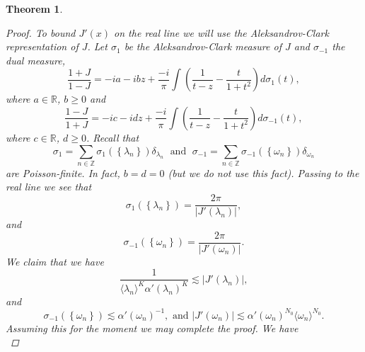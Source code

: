 \documentclass{article}[12pt]
\newtheorem{theorem}{Theorem}
\theoremstyle{remark}
\begin{document}
\begin{theorem}
\begin{proof}
            To bound $J'(x)$ on the real line we will use the Aleksandrov-Clark representation of $J$. Let $\sigma_{1}$ be the Aleksandrov-Clark measure of $J$ and $\sigma_{-1}$ the dual measure,
            \begin{equation*}
                \frac{1+J}{1-J} = -ia-ibz + \frac{-i}{ \pi}\int \left( \frac{1}{t-z}-\frac{t}{1+t^{2}}\right)d\sigma_{1}(t),
            \end{equation*}
            where $a \in \mathbb{R}$, $b \geq 0$ and
            \begin{equation*}
                \frac{1-J}{1+J} = -ic-idz + \frac{-i}{ \pi}\int \left( \frac{1}{t-z}-\frac{t}{1+t^{2}}\right)d\sigma_{-1}(t),
            \end{equation*}
            where $c \in \mathbb{R}$, $d \geq 0$. Recall that
            \begin{equation*}
                \sigma_{1} = \sum_{n \in \mathbb{Z}} \sigma_{1}(\left\{ \lambda_{n} \right\})\delta_{\lambda_{n}} \; \text{ and } \; \sigma_{-1} = \sum_{n \in \mathbb{Z}} \sigma_{-1}(\left\{ \omega_{n} \right\})\delta_{\omega_{n}}
            \end{equation*}
            are Poisson-finite. In fact, $b = d = 0$ (but we do not use this fact). Passing to the real line we see that
            \begin{equation*}
                \sigma_{1}(\left\{ \lambda_{n}\right\}) = \frac{2\pi}{\lvert J'(\lambda_{n}) \rvert},
            \end{equation*}
            and
            \begin{equation*}
                \sigma_{-1}(\left\{ \omega_{n}\right\}) = \frac{2\pi}{\lvert J'(\omega_{n}) \rvert}.
            \end{equation*}
            We claim that we have
            \begin{equation}\label{eq:est_below}
                \frac{1}{\langle \lambda_{n} \rangle^{K}\alpha'(\lambda_{n})^{K}}\lesssim \lvert J'(\lambda_{n}) \rvert,
            \end{equation}
            and
            \begin{equation}\label{eq:est_sigmas}
                \sigma_{-1}(\left\{ \omega_{n} \right\}) \lesssim \alpha'(\omega_{n})^{-1}, \text{ and } \lvert J'(\omega_{n})\rvert \lesssim \alpha'(\omega_{n})^{N_{0}} \langle \omega_{n} \rangle^{N_{0}}.
            \end{equation}
            Assuming this for the moment we may complete the proof. We have
            \begin{equation*}

\end{equation*}
\end{proof}
\end{theorem}
\end{document}
